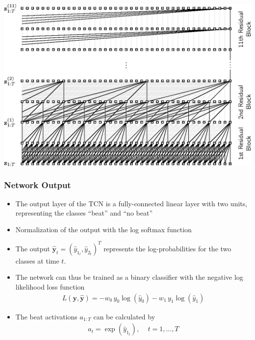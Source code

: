 \documentclass{beamer}
\begin{document}
\begin{frame}

\begin{minipage}{\textwidth} 
\centering
\includegraphics[scale=0.7]{figures/tcn.eps}
\end{minipage}
 
\end{frame}




\begin{frame}
\frametitle{Network Output}

\begin{itemize}
\item The output layer of the TCN is a fully-connected linear layer with two units, representing the classes ``beat'' and ``no beat''
\item Normalization of the output with the log softmax function 
\item The output $\hat{\mathbf y}_t = (\hat{y}_{1_t}, \hat{y}_{2_t})^T$ represents the log-probabilities for the two classes at time $t$.
\item The network can thus be trained as a binary classifier with the negative log likelihood loss function
\begin{align}
\label{eq:binary_cros_entropy_loss}
L(\mathbf y, \hat{\mathbf y}) = - w_0 \,y_0 \log(\hat{y}_0)-w_1\,y_1 \log(\hat{y}_1)
\end{align} 
\item The beat activations $a_{1:T}$ can be calculated by
\begin{align}
a_t = \exp \left({\hat{y}_{1_t}} \right), \quad \, t= 1,\dots,T
\end{align}  
\end{itemize}
\end{frame}
\end{document}
